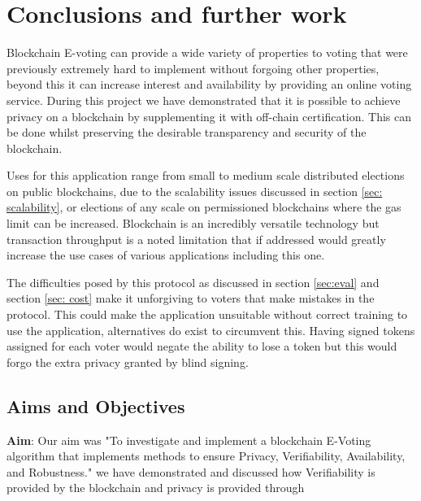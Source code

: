 \documentclass{entcs}
\begin{document}
\section{Conclusions and further work}
Blockchain E-voting can provide a wide variety of properties to voting that were previously extremely hard to implement without forgoing other properties, beyond this it can increase interest and availability by providing an online voting service. During this project we have demonstrated that it is possible to achieve privacy on a blockchain by supplementing it with off-chain certification. This can be done whilst preserving the desirable transparency and security of the blockchain. 

Uses for this application range from small to medium scale distributed elections on public blockchains, due to the scalability issues discussed in section \ref{sec: scalability}, or elections of any scale on permissioned blockchains where the gas limit can be increased. Blockchain is an incredibly versatile technology but transaction throughput is a noted limitation that if addressed would greatly increase the use cases of various applications including this one.

The difficulties posed by this protocol as discussed in section \ref{sec:eval} and section \ref{sec: cost} make it unforgiving to voters that make mistakes in the protocol. This could make the application unsuitable without correct training to use the application, alternatives do exist to circumvent this. Having signed tokens assigned for each voter would negate the ability to lose a token but this would forgo the extra privacy granted by blind signing.

\subsection{Aims and Objectives}
{\bf Aim}: Our aim was "To investigate and implement a blockchain E-Voting algorithm that implements methods to ensure Privacy, Verifiability, Availability, and Robustness." we have demonstrated and discussed how Verifiability is provided by the blockchain and privacy is provided through  
\end{document}
